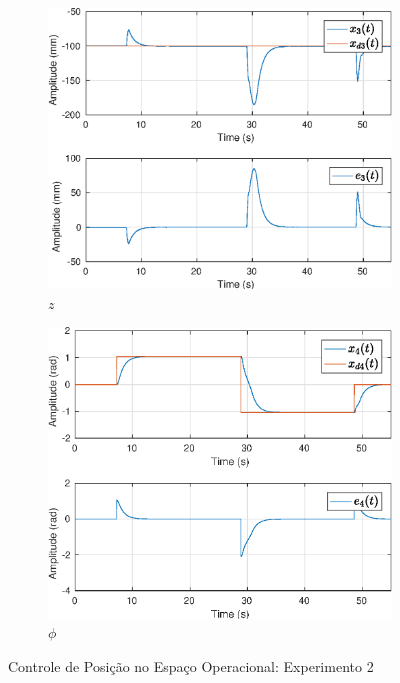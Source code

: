 \begin{figure}[H]
\begin{subfigure}{.5\textwidth}
  \centering
  \includegraphics[width=\linewidth]{./img/position2/x3.eps}
  \caption{$z$}
  \label{fig:oper_space_exp2_x3}
\end{subfigure}%
\begin{subfigure}{.5\textwidth}
  \centering
  \includegraphics[width=\linewidth]{./img/position2/x4.eps}
  \caption{$\phi$}
  \label{fig:pos_exp2_phi}
\end{subfigure}
\caption{Controle de Posição no Espaço Operacional: Experimento 2}
\label{fig:oper_space_exp2}
\end{figure}

